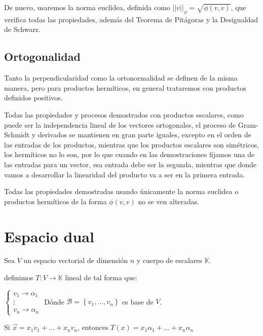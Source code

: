 \documentclass{preset}
\begin{document}
De nuevo, usaremos la norma euclídea, definida como $||v||_\phi=\sqrt{\phi(v,v)}$, que verifica todas las propiedades, además del Teorema de Pitágoras y la Desigualdad de Schwarz.


\vspace{-15pt}
\subsection{Ortogonalidad}
Tanto la perpendicularidad como la ortonormalidad se definen de la misma manera, pero para productos hermíticos, en general trataremos con productos definidos positivos.

Todas las propiedades y procesos demostrados con productos escalares, como puede ser la independencia lineal de los vectores ortogonales, el proceso de Gram-Schmidt y derivados se mantienen en gran parte iguales, excepto en el orden de las entradas de los productos, mientras que los productos escalares son simétricos, los hermíticos no lo son, por lo que cuando en las demostraciones fijamos una de las entradas para un vector, esa entrada debe ser la segunda, mientras que donde vamos a desarrollar la linearidad del producto va a ser en la primera entrada.

Todas las propiedades demostradas usando únicamente la norma euclidea o productos hermíticos de la forma $\phi(v,v)$ no se ven alteradas.

\vspace{-15pt}
\section{Espacio dual}
\vspace{-10pt}
Sea $V$ un espacio vectorial de dimensión $n$ y cuerpo de escalares $\mathbb{K}$.

definimos $T: V \rightarrow \mathbb{K}$ lineal de tal forma que:

\vspace{10pt}
\hspace{10pt}
$\left\{\begin{matrix}
v_1 \rightarrow \alpha_1 \\
\vdots \\
v_n \rightarrow \alpha_n
\end{matrix}\right.$
\hspace{10pt}
Dónde $\mathcal{B}=\left\{ v_1 , \dots, v_n \right\}$ es base de $V$.

\vspace{10pt}
Si $\vec{x} = x_1 v_1 + \dots + x_n v_n $, entonces $T(x)=x_1\alpha_1 + \dots + x_n\alpha_n$
\end{document}
